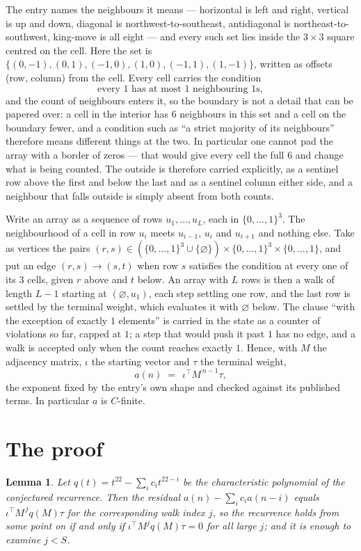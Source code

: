\documentclass[11pt,a4paper]{article}
\theoremstyle{plain}
\newtheorem{lemma}[theorem]{Lemma}
\theoremstyle{definition}
\begin{document}
The entry names the neighbours it means --- horizontal is left and right, vertical is up and
down, diagonal is northwest-to-southeast, antidiagonal is northeast-to-southwest, king-move is
all eight --- and every such set lies inside the $3\times3$ square centred on the cell. Here
the set is $\{(0,-1), (0,1), (-1,0), (1,0), (-1,1), (1,-1)\}$, written as offsets (row, column) from the cell. Every cell carries
the condition
\[
\text{every 1 has at most 1 neighbouring 1s},
\]
and the count of neighbours enters it, so the boundary is not a detail that can be papered
over: a cell in the interior has $6$ neighbours in this set and a cell on the boundary
fewer, and a condition such as ``a strict majority of its neighbours'' therefore means
different things at the two. In particular one cannot pad the array with a border of zeros ---
that would give every cell the full $6$ and change what is being counted. The outside is
therefore carried
explicitly, as a sentinel row above the first and below the last and as a sentinel column
either side, and a neighbour that falls outside is simply absent from both counts.

Write an array as a sequence of rows $u_1,\dots,u_L$, each in
$\{0,\dots,1\}^{3}$. The neighbourhood of a cell in row $u_i$ meets $u_{i-1}$,
$u_i$ and $u_{i+1}$ and nothing else. Take as vertices the pairs
$(r,s)\in(\{0,\dots,1\}^{3}\cup\{\varnothing\})\times\{0,\dots,1\}^{3} \times \{0,\dots,1\}$,
and put an edge $(r,s)\to(s,t)$ when row $s$ satisfies the condition at every one of its
$3$ cells, given $r$ above and $t$ below. An array with $L$ rows is then a walk of length
$L-1$ starting at $(\varnothing,u_1)$, each step settling one row, and the last row is
settled by the terminal weight, which evaluates it with $\varnothing$ below. The clause ``with the exception of exactly $1$ elements'' is carried in
the state as a counter of violations so far, capped at $1$; a step that would push it past
$1$ has no edge, and a walk is accepted only when the count reaches exactly $1$. Hence,
with $M$ the adjacency matrix, $\iota$ the starting vector and $\tau$ the terminal weight,
\[
a(n)\;=\;\,\iota^{\!\top}M^{\,n-1}\tau ,
\]
the exponent fixed by the entry's own shape and checked against its published terms. In
particular $a$ is $C$-finite.

\section{The proof}

\begin{lemma}\label{lem:crit}
Let $q(t)=t^{22}-\sum_i c_it^{22-i}$ be the characteristic polynomial of the
conjectured recurrence. Then the residual $a(n)-\sum_ic_ia(n-i)$ equals
$\iota^{\!\top}M^{\,j}q(M)\tau$ for the corresponding walk index $j$, so the
recurrence holds from some point on if and only if $\iota^{\!\top}M^{j}q(M)\tau=0$ for all
large $j$; and it is enough to examine $j<S$.
\end{lemma}
\end{document}
